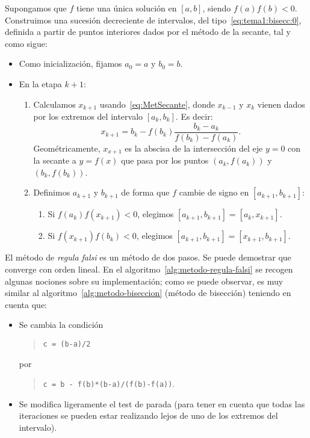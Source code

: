 Supongamos que $f$ tiene una única solución en
$[a,b]$, siendo $f(a)f(b)<0$.  Construimos una sucesión decreciente de
intervalos, del tipo~\eqref{eq:tema1:bisecc:0}, definida a partir de
puntos interiores dados por el método de la secante, tal y como sigue:
\begin{itemize}
\item Como inicialización, fijamos $a_0=a$ y $b_0=b$.
\item En la etapa $k+1$:
  \begin{enumerate}%
  \item 
    Calculamos $x_{k+1}$ usando~\eqref{eq:MetSecante}, donde $x_{k-1}$
    y $x_k$ vienen dados por los extremos del intervalo
    $[a_k,b_k]$. Es decir:
    \begin{equation*}
      x_{k+1} = b_k - f(b_k) \dfrac{b_k-a_k}{f(b_k)-f(a_k)}.
    \end{equation*}
    Geométricamente, $x_{x+1}$ es la abscisa de la
    intersección del eje $y=0$ con la secante a $y=f(x)$ que pasa por
    los puntos $(a_k,f(a_k))$ y $(b_k,f(b_k))$.
  \item Definimos $a_{k+1}$ y $b_{k+1}$ de forma que $f$ cambie de signo en
    $[a_{k+1},b_{k+1}]$:
    \begin{enumerate}
    \item Si $f(a_{k})f(x_{k+1})<0$, elegimos $[a_{k+1},b_{k+1}]=[a_{k}, x_{k+1}]$.
    \item Si $f(x_{k+1})f(b_{k})<0$, elegimos $[a_{k+1},b_{k+1}]=[x_{k+1}, b_{k+1}]$.
    \end{enumerate}
  \end{enumerate}
\end{itemize}

El método de \textit{regula falsi} es un método de dos pasos. Se puede
demostrar que converge con orden lineal. En el
algoritmo~\ref{alg:metodo-regula-falsi} se recogen algunas nociones
sobre su implementación; como se puede observar, es muy similar al
algoritmo~\ref{alg:metodo-biseccion} (método de bisección) teniendo en
cuenta que:
\begin{itemize}
\item Se cambia la condición 
  \begin{quote}
    \texttt{c = (b-a)/2}
  \end{quote}
  por 
  \begin{quote}
    \texttt{c = b - f(b)*(b-a)/(f(b)-f(a))}.
  \end{quote}
\item Se modifica ligeramente el test de parada (para tener en
  cuenta que todas las iteraciones se pueden estar realizando lejos de
  uno de los extremos del intervalo).
\end{itemize}


